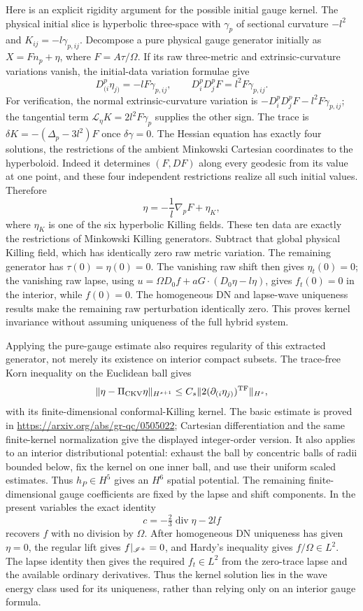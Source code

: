Here is an explicit rigidity argument for the possible initial gauge kernel.
The physical initial slice is hyperbolic three-space with
$\gamma_p$ of sectional curvature $-l^2$ and $K_{ij}=-l\gamma_{p,ij}$.
Decompose a pure physical gauge generator initially as
$X=F n_p+\eta$, where $F=A\tau/\Omega$.  If its raw three-metric and
extrinsic-curvature variations vanish, the initial-data variation formulae
give
\[
 D^p_{(i}\eta_{j)}=-lF\gamma_{p,ij},\qquad
 D^p_iD^p_jF=l^2F\gamma_{p,ij}.
\]
For verification, the normal extrinsic-curvature variation is
$-D^p_iD^p_jF-l^2F\gamma_{p,ij}$; the tangential term
$\mathcal L_\eta K=2l^2F\gamma_p$ supplies the other sign.  The trace is
$\delta K=-(\Delta_p-3l^2)F$ once $\delta\gamma=0$.
The Hessian equation has exactly four solutions, the restrictions of the
ambient Minkowski Cartesian coordinates to the hyperboloid.  Indeed it
determines $(F,DF)$ along every geodesic from its value at one point, and
these four independent restrictions realize all such initial values.
Therefore
\[
 \eta=-\frac1l\nabla_pF+\eta_K,
\]
where $\eta_K$ is one of the six hyperbolic Killing fields.  These ten data
are exactly the restrictions of Minkowski Killing generators.  Subtract
that global physical Killing field, which has identically zero raw metric
variation.  The remaining generator has $\tau(0)=\eta(0)=0$.
The vanishing raw shift then gives $\eta_t(0)=0$; the vanishing raw lapse,
using $u=\Omega D_0f+aG\cdot(D_0\eta-l\eta)$, gives $f_t(0)=0$ in the
interior, while $f(0)=0$.  The homogeneous DN and lapse-wave uniqueness
results make the remaining raw perturbation identically zero.  This proves
kernel invariance without assuming uniqueness of the full hybrid system.

Applying the pure-gauge estimate also requires regularity of this extracted
generator, not merely its existence on interior compact subsets.  The
trace-free Korn inequality on the Euclidean ball gives
\[
 \|\eta-\Pi_{\rm CKV}\eta\|_{H^{s+1}}
 \leq C_s\|2(\partial_{(i}\eta_{j)})^{\rm TF}\|_{H^s},
\]
with its finite-dimensional conformal-Killing kernel.  The basic estimate is
proved in \url{https://arxiv.org/abs/gr-qc/0505022}; Cartesian differentiation
and the same finite-kernel normalization give the displayed integer-order
version.  It also applies to an interior distributional potential: exhaust
the ball by concentric balls of radii bounded below, fix the kernel on one
inner ball, and use their uniform scaled estimates.  Thus $h_P\in H^5$
gives an $H^6$ spatial potential.  The remaining finite-dimensional gauge
coefficients are fixed by the lapse and shift components.
In the present variables the exact identity
\[
 c=-\tfrac23\operatorname{div}\eta-2lf
\]
recovers $f$ with no division by $\Omega$.  After homogeneous DN uniqueness
has given $\eta=0$, the regular lift gives $f|_{\mathscr I^+}=0$, and Hardy's
inequality gives $f/\Omega\in L^2$.  The lapse identity then gives the
required $f_t\in L^2$ from the zero-trace lapse and the available ordinary
derivatives.  Thus the kernel solution lies in the wave energy class used
for its uniqueness, rather than relying only on an interior gauge formula.

